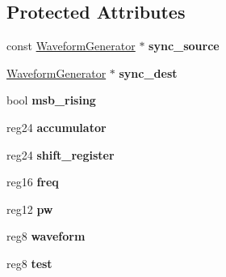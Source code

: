 \subsection*{Protected Attributes}
\begin{DoxyCompactItemize}
\item 
\hypertarget{classWaveformGenerator_ad35f46138d48031ca05de2bad4298f91}{const \hyperlink{classWaveformGenerator}{Waveform\-Generator} $\ast$ {\bfseries sync\-\_\-source}}\label{classWaveformGenerator_ad35f46138d48031ca05de2bad4298f91}

\item 
\hypertarget{classWaveformGenerator_ac432b9e37cfd277b56865be6f3e2092f}{\hyperlink{classWaveformGenerator}{Waveform\-Generator} $\ast$ {\bfseries sync\-\_\-dest}}\label{classWaveformGenerator_ac432b9e37cfd277b56865be6f3e2092f}

\item 
\hypertarget{classWaveformGenerator_ab6aceff4bebe9fb1eaf0bc8b64d7bacd}{bool {\bfseries msb\-\_\-rising}}\label{classWaveformGenerator_ab6aceff4bebe9fb1eaf0bc8b64d7bacd}

\item 
\hypertarget{classWaveformGenerator_ac7ace4ac7f500d509c6c452f1fef32c0}{reg24 {\bfseries accumulator}}\label{classWaveformGenerator_ac7ace4ac7f500d509c6c452f1fef32c0}

\item 
\hypertarget{classWaveformGenerator_a72fcff70c53e4ccf80322c1dd0f404d8}{reg24 {\bfseries shift\-\_\-register}}\label{classWaveformGenerator_a72fcff70c53e4ccf80322c1dd0f404d8}

\item 
\hypertarget{classWaveformGenerator_a98db8a7647cf831d21fd51197761b48f}{reg16 {\bfseries freq}}\label{classWaveformGenerator_a98db8a7647cf831d21fd51197761b48f}

\item 
\hypertarget{classWaveformGenerator_ac2633ade5781b5b4a714866c8e4c7028}{reg12 {\bfseries pw}}\label{classWaveformGenerator_ac2633ade5781b5b4a714866c8e4c7028}

\item 
\hypertarget{classWaveformGenerator_ad57778dcb14199a5b8fd4719ffbb9aab}{reg8 {\bfseries waveform}}\label{classWaveformGenerator_ad57778dcb14199a5b8fd4719ffbb9aab}

\item 
\hypertarget{classWaveformGenerator_aa9a2bf2b348808814890b4f55c7b3588}{reg8 {\bfseries test}}\label{classWaveformGenerator_aa9a2bf2b348808814890b4f55c7b3588}


\end{DoxyCompactItemize}
